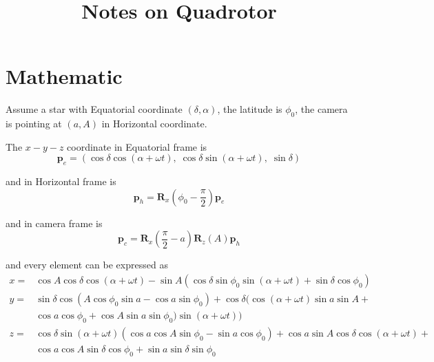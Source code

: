 \documentclass[11pt,letterpaper]{article}
\begin{document}
\title{Notes on Quadrotor}
\maketitle

\pagestyle{myheadings}  %

\section{Mathematic}
Assume a star with Equatorial coordinate $(\delta, \alpha)$, the latitude is $\phi_0$, the camera is pointing
at $(a, A)$ in Horizontal coordinate. 

The $x-y-z$ coordinate in Equatorial frame is
\begin{equation}
    \boldsymbol{p}_e = (\cos\delta \cos(\alpha + \omega t),\; \cos\delta \sin(\alpha + \omega t),\; \sin\delta)
\end{equation}

and in Horizontal frame is
\begin{equation}
    \boldsymbol{p}_h = \boldsymbol{R}_x\left(\phi_0-\frac{\pi}{2}\right)\boldsymbol{p}_e
\end{equation}

and in camera frame is
\begin{equation}
    \boldsymbol{p}_c = \boldsymbol{R}_x\left(\frac{\pi}{2}-a\right)\boldsymbol{R}_z(A)\boldsymbol{p}_h
\end{equation}

and every element can be expressed as
\begin{equation}
\begin{split}
    x =& \cos A \cos \delta  \cos (\alpha +\omega t)-\sin A (\cos \delta  \sin
        \phi_0 \sin (\alpha +\omega t)+\sin \delta  \cos \phi_0) \\
    y=&\sin \delta  \cos(A \cos \phi_0 \sin a - \cos a \sin \phi_0) + 
 \cos \delta (\cos(\alpha + \omega t) \sin a \sin A +  \\
 &\cos a \cos \phi_0 + 
 \cos A \sin a \sin \phi_0) \sin(\alpha + \omega t))\\
    z =&\cos \delta 
       \sin (\alpha +\omega t) (\cos a \cos A \sin \phi_0-\sin a \cos
       \phi_0)+\cos a \sin A \cos \delta  \cos (\alpha +\omega t)+ \\
       &\cos a \cos A \sin \delta  \cos \phi_0+\sin a \sin \delta  \sin \phi_0
\end{split}
\end{equation}
\end{document}
